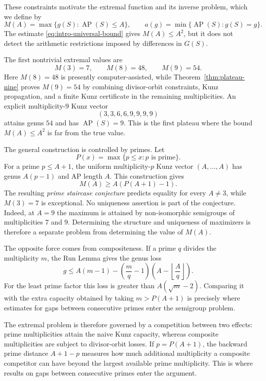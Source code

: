 \documentclass[11pt]{article}
\theoremstyle{plain}
\theoremstyle{definition}
\theoremstyle{remark}
\newcommand{\AP}{\operatorname{AP}}
\begin{document}
These constraints motivate the extremal function and its inverse problem,
which we define by
\[
  M(A)=\max\{g(S):\AP(S)\leq A\},
  \qquad
  a(g)=\min\{\AP(S):g(S)=g\}.
\]
The estimate \eqref{eq:intro-universal-bound} gives $M(A)\leq A^2$, but it
does not detect the arithmetic restrictions imposed by differences in
$G(S)$.

The first nontrivial extremal values are
\[
  M(3)=7,
  \qquad M(8)=48,
  \qquad M(9)=54.
\]
Here $M(8)=48$ is presently computer-assisted, while
Theorem~\ref{thm:plateau-nine} proves $M(9)=54$ by combining divisor-orbit
constraints, Kunz propagation, and a finite Kunz certificate in the remaining
multiplicities.  An explicit multiplicity-$9$
Kunz vector
\[
  (3,3,6,6,9,9,9,9)
\]
attains genus $54$ and has $\AP(S)=9$.  This is the first plateau where the
bound $M(A)\leq A^2$ is far from the true value.

The general construction is controlled by primes.  Let
\[
  P(x)=\max\{p\leq x:p\text{ is prime}\}.
\]
For a prime $p\leq A+1$, the uniform multiplicity-$p$ Kunz vector
$(A,\ldots,A)$ has genus $A(p-1)$ and AP length $A$.  This construction gives
\begin{equation}\label{eq:intro-staircase-lower}
  M(A)\geq A(P(A+1)-1).
\end{equation}
The resulting \emph{prime staircase conjecture} predicts equality for every
$A\neq 3$, while $M(3)=7$ is exceptional.  No uniqueness assertion is part of
the conjecture.  Indeed, at $A=9$ the maximum is attained by non-isomorphic
semigroups of multiplicities $7$ and $9$.  Determining the structure and
uniqueness of maximizers is therefore a separate problem from determining
the value of $M(A)$.

The opposite force comes from compositeness.  If a prime $q$ divides the
multiplicity $m$, the Run Lemma gives the genus loss
\begin{equation}\label{eq:intro-composite-loss}
  g\leq A(m-1)-\left(\frac mq-1\right)
  \left(A-\left\lfloor\frac Aq\right\rfloor\right).
\end{equation}
For the least prime factor this loss is greater than $A(\sqrt m-2)$.  Comparing
it with the extra capacity obtained by taking $m>P(A+1)$ is precisely where
estimates for gaps between consecutive primes enter the semigroup problem.

The extremal problem is therefore governed by a competition between two
effects: prime multiplicities attain the naive Kunz capacity, whereas composite
multiplicities are subject to divisor-orbit losses.  If $p=P(A+1)$, the
backward prime distance $A+1-p$ measures how much additional multiplicity a
composite competitor can have beyond the largest available prime
multiplicity.  This is where results on gaps between consecutive primes
enter the argument.
\end{document}
